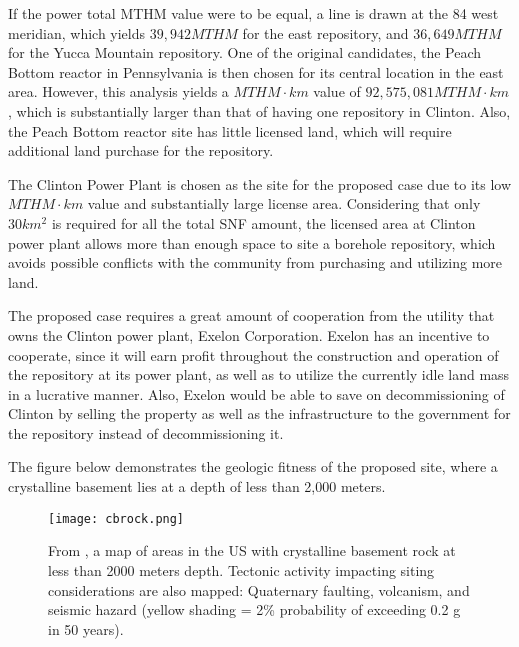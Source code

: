 If the power total MTHM value were to be equal, a line is drawn at the 84 west
meridian, which yields $39,942 MTHM$ for the east repository, and $36,649 MTHM$ for
the Yucca Mountain repository. One of the original candidates, the Peach Bottom
reactor in Pennsylvania is then chosen for its central location in the east area.
However, this analysis yields a $MTHM\cdot km$ value of $92,575,081 MTHM\cdot km$,
which is substantially larger than that of having one repository in Clinton. 
Also, the Peach Bottom reactor site has little licensed land, which will require
additional land purchase for the repository. 


The Clinton Power Plant is chosen as the site for the proposed case due to its
low $MTHM\cdot km$ value and substantially large license area\cite{NRC_Clinton}.
 Considering that only
 $30km^2$ is required for all the total \gls{SNF} amount, the licensed area at Clinton
  power plant allows more than  enough space to site a borehole repository, which
   avoids possible conflicts with the community from purchasing and utilizing more
    land. 
  
  The proposed case requires a great amount of cooperation from the utility that owns
  the Clinton power plant, Exelon Corporation. 
  Exelon has an incentive to cooperate,
  since it will earn profit throughout the construction and operation of the 
  repository at its power plant, as well as to utilize the currently idle land mass
  in a lucrative manner. Also, Exelon would be able to save on decommissioning of
  Clinton by selling the property as well as the infrastructure to the government 
  for the repository instead of decommissioning it.  
  
  
  
  The figure below demonstrates the geologic fitness of the proposed site, where 
  a crystalline basement lies at a depth of less than 2,000 meters.



\begin{figure}[!h] 
  \centering
  \texttt{[image: cbrock.png]}	
        \caption{From \cite{Perry_2015}, a map of areas in the US with 
        crystalline basement rock at less than 2000 meters depth. Tectonic 
        activity impacting siting considerations are also mapped:  Quaternary 
        faulting, volcanism, and seismic hazard (yellow shading = 2\% 
        probability of exceeding 0.2 g in 50 years).}
  \label{fig:cbrock}
\end{figure}

